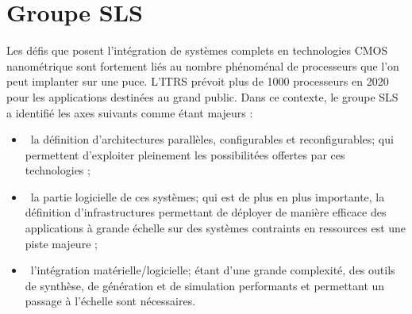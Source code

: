 \section{Groupe SLS}
\label{sec:sls}
Les défis que posent l'intégration de systèmes complets en technologies CMOS nanométrique sont fortement liés au nombre phénoménal de processeurs que l'on peut implanter sur une puce. L'ITRS prévoit plus de 1000 processeurs en 2020 pour les applications destinées au grand public. Dans ce contexte, le groupe SLS a identifié les axes suivants comme étant majeurs :
\begin{itemize}
\item\ la définition d'architectures parallèles, configurables et reconfigurables; qui permettent d'exploiter pleinement les possibilitées offertes par ces technologies ;
\item\ la partie logicielle de ces systèmes; qui est de plus en plus importante, la définition d'infrastructures permettant de déployer de manière efficace des applications à grande échelle sur des systèmes contraints en ressources est une piste majeure ;
\item\ l'intégration matérielle/logicielle; étant d'une grande complexité, des outils de synthèse, de génération et de simulation performants et permettant un passage à l'échelle sont nécessaires.
\end{itemize}